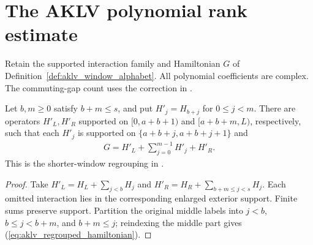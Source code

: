 \section{The AKLV polynomial rank estimate}

Retain the supported interaction family and Hamiltonian $G$ of
Definition~\ref{def:aklv_window_alphabet}. All polynomial coefficients are complex.
The commuting-gap count uses the correction in
\cite{gap:aklv13_interpolation_and_word_count}.

\begin{lemma}
    \label{thm:aklv_subwindow_regrouping}
    \leanok
    Let $b,m\ge0$ satisfy $b+m\le s$, and put $H'_j=H_{b+j}$ for $0\le j<m$.
    There are operators $H'_L,H'_R$ supported on ${\lbrack 0,a+b+1)}$ and ${\lbrack a+b+m,L)}$,
    respectively, such that each $H'_j$ is supported on
    $\{a+b+j,a+b+j+1\}$ and
    \begin{align}
        G=H'_L+\sum_{j=0}^{m-1}H'_j+H'_R.
        \label{eq:aklv_regrouped_hamiltonian}
    \end{align}
    This is the shorter-window regrouping in
    \cite[Lemma~4.2]{Arad2013AreaLaw}.
\end{lemma}
\begin{proof}
    \leanok
    Take $H'_L=H_L+\sum_{j<b}H_j$ and
    $H'_R=H_R+\sum_{b+m\le j<s}H_j$.
    Each omitted interaction lies in the corresponding enlarged exterior support.
    Finite sums preserve support. Partition the original middle labels into
    $j<b$, $b\le j<b+m$, and $b+m\le j$; reindexing the middle part gives
    (\ref{eq:aklv_regrouped_hamiltonian}).
\end{proof}

